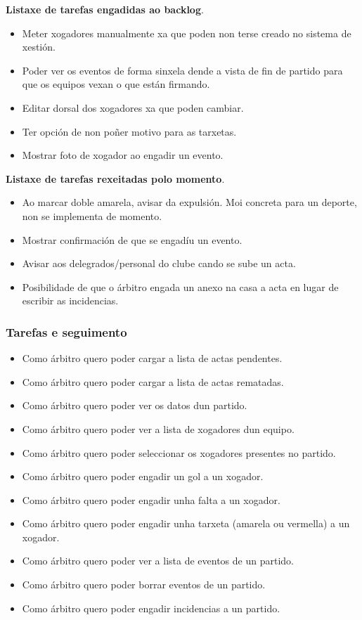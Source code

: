       \textbf{Listaxe de tarefas engadidas ao backlog}.
        \begin{itemize}
          \item Meter xogadores manualmente xa que poden non terse creado no 
sistema de xestión.
          \item Poder ver os eventos de forma sinxela dende a vista de fin de 
partido para que os equipos vexan o que están firmando.
         \item Editar dorsal dos xogadores xa que poden cambiar.
         \item Ter opción de non poñer motivo para as tarxetas.
         \item Mostrar foto de xogador ao engadir un evento.
        \end{itemize}

      \textbf{Listaxe de tarefas rexeitadas polo momento}.
        \begin{itemize}
         \item Ao marcar doble amarela, avisar da expulsión. Moi concreta para 
un deporte, non se implementa de momento.
         \item Mostrar confirmación de que se engadíu un evento.
         \item Avisar aos delegrados/personal do clube cando se sube un acta.
         \item Posibilidade de que o árbitro engada un anexo na casa a acta en 
lugar de escribir as incidencias.
        \end{itemize}

      \subsubsection{Tarefas e seguimento}

            \begin{itemize}
        \item Como árbitro quero poder cargar a lista de actas pendentes.
        \item Como árbitro quero poder cargar a lista de actas rematadas.
        \item Como árbitro quero poder ver os datos dun partido.
        \item Como árbitro quero poder ver a lista de xogadores dun equipo.
        \item Como árbitro quero poder seleccionar os xogadores presentes no 
partido.
        \item Como árbitro quero poder engadir un gol a un xogador.
        \item Como árbitro quero poder engadir unha falta a un xogador.
        \item Como árbitro quero poder engadir unha tarxeta (amarela ou 
vermella) a un xogador.
        \item Como árbitro quero poder ver a lista de eventos de un partido.
        \item Como árbitro quero poder borrar eventos de un partido.
        \item Como árbitro quero poder engadir incidencias a un partido.
       \end{itemize}




